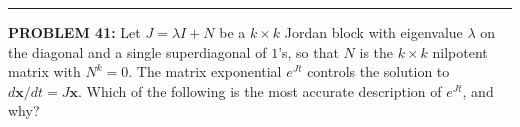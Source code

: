 \documentclass[12pt]{amsart}
\newcommand{\divider}{
  \vspace{-1em} %
  \noindent
  \raisebox{-0.15ex}{\textbullet}%
  \hspace{0.5em}%
  \rule[0.5ex]{0.95\textwidth}{1.0pt}%
  \hspace{0.5em}%
  \raisebox{-0.15ex}{\textbullet}%
  \vspace{0em} %
}
\begin{document}
%
%
%

\divider

{\bf PROBLEM 41:}
%
Let $J = \lambda I + N$ be a $k \times k$ Jordan block with eigenvalue
$\lambda$ on the diagonal and a single superdiagonal of $1$'s, so that $N$
is the $k \times k$ nilpotent matrix with $N^k = 0$. The matrix exponential
$e^{Jt}$ controls the solution to $d\mathbf{x}/dt = J\mathbf{x}$.
Which of the following is the most accurate description of $e^{Jt}$, and
why?
\end{document}
